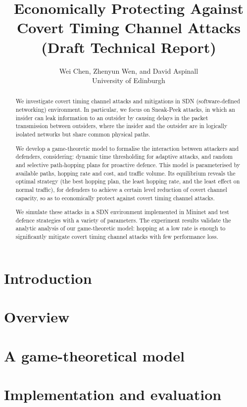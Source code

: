 \documentclass[a4paper,11pt]{article}
\title{Economically Protecting Against Covert Timing Channel Attacks\\
(Draft Technical Report)}
\author{Wei Chen, Zhenyun Wen, and David Aspinall\\ 
University of Edinburgh}
\begin{document}
\maketitle
\begin{abstract}
We investigate covert timing channel attacks and mitigations in SDN
(software-defined networking) environment. In particular, we focus on Sneak-Peek
attacks, in which an insider can leak information to an outsider by causing
delays in the packet transmission between outsiders, where the insider and the
outsider are in logically isolated networks but share common physical paths.

We develop a game-theoretic model to formalise the interaction between attackers
and defenders, considering: dynamic time thresholding for adaptive attacks, and
random and selective path-hopping plans for proactive defence. This model is
parameterised by available paths, hopping rate and cost, and traffic volume. Its
equilibrium reveals the optimal strategy (the best hopping plan, the least
hopping rate, and the least effect on normal traffic), for defenders to achieve
a certain level reduction of covert channel capacity, so as to economically
protect against covert timing channel attacks.

We simulate these attacks in a SDN environment implemented in Mininet and test
defence strategies with a variety of parameters. The experiment results validate
the analytic analysis of our game-theoretic model: hopping at a low rate is
enough to significantly mitigate covert timing channel attacks with few
performance loss. 
\end{abstract}
\section{Introduction}
\section{Overview}
\section{A game-theoretical model}
\section{Implementation and evaluation}
\end{document}
